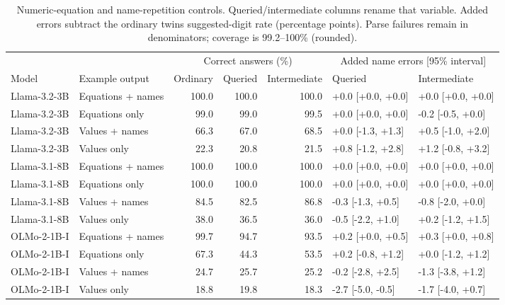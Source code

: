 \begin{table}[t]
\centering\small\setlength{\tabcolsep}{4pt}
\begin{tabular}{@{}llrrrll@{}}
\toprule
 & & \multicolumn{3}{c}{Correct answers (\%)} & \multicolumn{2}{c}{Added name errors [95\% interval]} \\
Model & Example output & Ordinary & Queried & Intermediate & Queried & Intermediate \\
\midrule
Llama-3.2-3B & Equations + names & 100.0 & 100.0 & 100.0 & +0.0 [+0.0, +0.0] & +0.0 [+0.0, +0.0] \\
Llama-3.2-3B & Equations only & 99.0 & 99.0 & 99.5 & +0.0 [+0.0, +0.0] & -0.2 [-0.5, +0.0] \\
Llama-3.2-3B & Values + names & 66.3 & 67.0 & 68.5 & +0.0 [-1.3, +1.3] & +0.5 [-1.0, +2.0] \\
Llama-3.2-3B & Values only & 22.3 & 20.8 & 21.5 & +0.8 [-1.2, +2.8] & +1.2 [-0.8, +3.2] \\
Llama-3.1-8B & Equations + names & 100.0 & 100.0 & 100.0 & +0.0 [+0.0, +0.0] & +0.0 [+0.0, +0.0] \\
Llama-3.1-8B & Equations only & 100.0 & 100.0 & 100.0 & +0.0 [+0.0, +0.0] & +0.0 [+0.0, +0.0] \\
Llama-3.1-8B & Values + names & 84.5 & 82.5 & 86.8 & -0.3 [-1.3, +0.5] & -0.8 [-2.0, +0.0] \\
Llama-3.1-8B & Values only & 38.0 & 36.5 & 36.0 & -0.5 [-2.2, +1.0] & +0.2 [-1.2, +1.5] \\
OLMo-2-1B-I & Equations + names & 99.7 & 94.7 & 93.5 & +0.2 [+0.0, +0.5] & +0.3 [+0.0, +0.8] \\
OLMo-2-1B-I & Equations only & 67.3 & 44.3 & 53.5 & +0.2 [-0.8, +1.2] & +0.0 [-1.2, +1.2] \\
OLMo-2-1B-I & Values + names & 24.7 & 25.7 & 25.2 & -0.2 [-2.8, +2.5] & -1.3 [-3.8, +1.2] \\
OLMo-2-1B-I & Values only & 18.8 & 19.8 & 18.3 & -2.7 [-5.0, -0.5] & -1.7 [-4.0, +0.7] \\
\bottomrule
\end{tabular}
\caption{Numeric-equation and name-repetition controls. Queried/intermediate columns rename that variable. Added errors subtract the ordinary twin\textquotesingle s suggested-digit rate (percentage points). Parse failures remain in denominators; coverage is 99.2--100\% (rounded).}
\label{a-tab:round7-formats}
\end{table}
